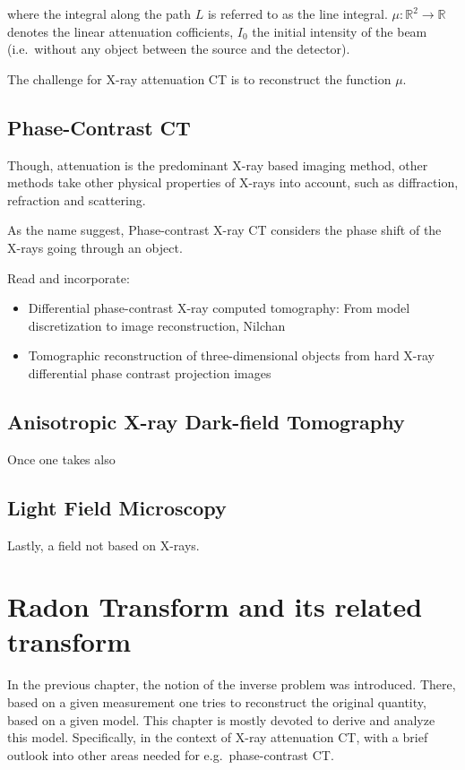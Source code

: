 where the integral along the path \(L\) is referred to as the line integral.
\(\mu \colon \mathbb{R}^2 \to \mathbb{R}\) denotes the linear attenuation cofficients, \(I_0\)
the initial intensity of the beam (i.e.\ without any object between the source and the detector).

The challenge for X-ray attenuation CT is to reconstruct the function \(\mu\).

\section{Phase-Contrast CT}\label{sec:phasecontrast_ct}

Though, attenuation is the predominant X-ray based imaging method, other methods take other physical
properties of X-rays into account, such as diffraction, refraction and scattering.

As the name suggest, Phase-contrast X-ray CT considers the phase shift of the X-rays going through
an object.

Read and incorporate:
\begin{itemize}
	\item Differential phase-contrast X-ray computed tomography: From model discretization to image
	      reconstruction, Nilchan
	\item Tomographic reconstruction of three-dimensional objects from hard X-ray differential phase
	      contrast projection images
\end{itemize}


\section{Anisotropic X-ray Dark-field Tomography}\label{sec:axdt}

Once one takes also

\section{Light Field Microscopy}\label{sec:lightfield_microscopy}

Lastly, a field not based on X-rays.


\chapter{Radon Transform and its related transform}\label{chap:radon_transform_and_related}

In the previous chapter, the notion of the inverse problem was introduced. There, based on a given
measurement one tries to reconstruct the original quantity, based on a given model. This chapter is
mostly devoted to derive and analyze this model. Specifically, in the context of X-ray attenuation
CT, with a brief outlook into other areas needed for e.g.\ phase-contrast CT\@.

